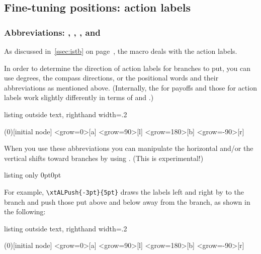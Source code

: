 \subsection{Fine-tuning positions: action labels}

\subsubsection{Abbreviations: \xw{[l]}, \xw{[r]}, \xw{[a]}, and \xw{[b]}}

As discussed in~\ref{ssec:istb} on page~\pageref{ssec:istb}, the macro \cmd{\istb} deals with the action labels.

In order to determine the direction of action labels for branches to put, you can use degrees, the compass directions, or the positional words and their abbreviations as mentioned above.
(Internally, the  for payoffs and those for action labels work slightly differently in terms of  and .)

\begin{tcblisting}{listing outside text, righthand width=.2\linewidth}
\begin{istgame}[scale=1.2]
\xtShowEndPoints
\xtdistance{12mm}{16mm}
\istroot(0)[initial node]
  \istb<grow=0>{}[a]   \istb<grow=90>{}[l]
  \istb<grow=180>{}[b] \istb<grow=-90>{}[r]
  \endist
\end{istgame}
\end{tcblisting}

When you use these abbreviations you can manipulate the horizontal and/or the vertical shifts toward branches by using \icmd{\xtALPush}. (This is experimental!)


\begin{tcblisting}{listing only}
  {0pt}{0pt}
\end{tcblisting}

For example, \verb|\xtALPush{-3pt}{5pt}| draws the labels left and right by \xw{3pt} to the branch and push those put above and below \xw{5pt} away from the branch, as shown in the following:

\begin{tcblisting}{listing outside text, righthand width=.2\linewidth}
\begin{istgame}[scale=1.2]
\xtShowEndPoints
\xtALPush{-3pt}{5pt} %
\xtdistance{12mm}{16mm}
\istroot(0)[initial node]
  \istb<grow=0>{}[a]   \istb<grow=90>{}[l]
  \istb<grow=180>{}[b] \istb<grow=-90>{}[r]
  \endist
\end{istgame}
\end{tcblisting}


